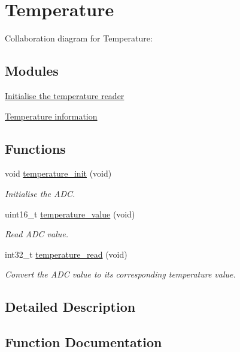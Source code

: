 \hypertarget{group___temperature}{}\section{Temperature}
\label{group___temperature}
Collaboration diagram for Temperature\+:
\subsection*{Modules}
\begin{DoxyCompactItemize}
\item 
\hyperlink{group___temperature___init}{Initialise the temperature reader}
\item 
\hyperlink{group___temperature___data}{Temperature information}
\end{DoxyCompactItemize}
\subsection*{Functions}
\begin{DoxyCompactItemize}
\item 
void \hyperlink{group___temperature_ga7da890f6748bbeb05511fd20100cb6ef}{temperature\+\_\+init} (void)
\begin{DoxyCompactList}\small\item\em Initialise the A\+DC. \end{DoxyCompactList}\item 
uint16\+\_\+t \hyperlink{group___temperature_ga74915aedf88ee7840a64ab372d768ca1}{temperature\+\_\+value} (void)
\begin{DoxyCompactList}\small\item\em Read A\+DC value. \end{DoxyCompactList}\item 
int32\+\_\+t \hyperlink{group___temperature_gad2e261b9f6af30d5857f1e2a892a9592}{temperature\+\_\+read} (void)
\begin{DoxyCompactList}\small\item\em Convert the A\+DC value to its corresponding temperature value. \end{DoxyCompactList}\end{DoxyCompactItemize}


\subsection{Detailed Description}


\subsection{Function Documentation}
\mbox{\label{group___temperature_ga7da890f6748bbeb05511fd20100cb6ef}} 
